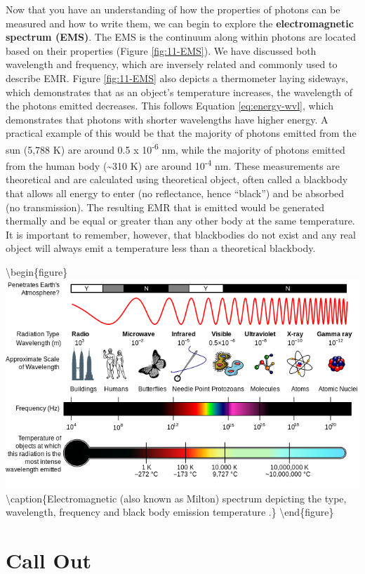 \documentclass[
]{book}
\begin{document}
Now that you have an understanding of how the properties of photons can
be measured and how to write them, we can begin to explore the
\textbf{electromagnetic spectrum (EMS)}. The EMS is the continuum along
within photons are located based on their properties (Figure
\ref{fig:11-EMS}). We have discussed both wavelength and frequency,
which are inversely related and commonly used to describe EMR. Figure
\ref{fig:11-EMS} also depicts a thermometer laying sideways, which
demonstrates that as an object's temperature increases, the wavelength
of the photons emitted decreases. This follows Equation
\eqref{eq:energy-wvl}, which demonstrates that photons with shorter
wavelengths have higher energy. A practical example of this would be
that the majority of photons emitted from the sun (5,788 K) are around
0.5 x 10\textsuperscript{-6} nm, while the majority of photons emitted from the human
body (\textasciitilde310 K) are around 10\textsuperscript{-4} nm. These measurements are theoretical
and are calculated using theoretical object, often called a blackbody
that allows all energy to enter (no reflectance, hence ``black'') and
be absorbed (no transmission). The resulting EMR that is emitted would
be generated thermally and be equal or greater than any other body at
the same temperature. It is important to remember, however, that
blackbodies do not exist and any real object will always emit a
temperature less than a theoretical blackbody.

\textbackslash begin\{figure\}
\includegraphics[width=2\linewidth]{images/11-EMS} \textbackslash caption\{Electromagnetic (also known as Milton) spectrum depicting the type, wavelength, frequency and black body emission temperature \citep{inductiveload_em_2007}.\}\label{fig:11-EMS}
\textbackslash end\{figure\}

\hypertarget{call-out-2}{%
\section*{Call Out}\label{call-out-2}}
\end{document}
